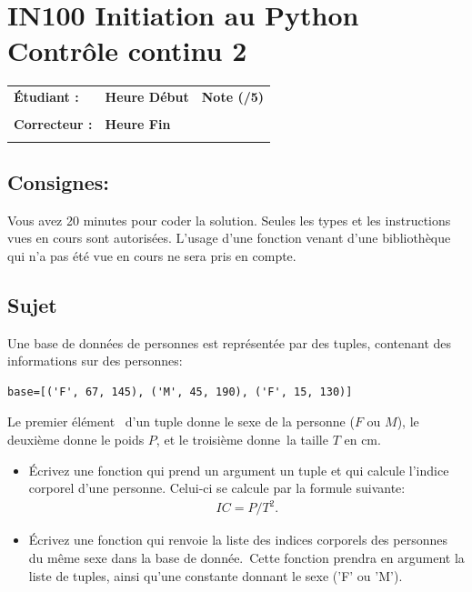 \documentclass[a4paper,11pt]{article}
\begin{document}
\newtheorem{theo}{Theorem}
\newtheorem{coro}{Corollary}[theo]
\newtheorem{lemme}{Lemma}
\renewcommand{\thecoro}{\thetheo.\arabic{coro}}



\parindent=0cm


\section*{\center IN100 Initiation au Python\\
Contrôle continu 2}

\vspace{1 cm}

\begin{table}[h!]
\centering
\renewcommand{\arraystretch}{1.4} %
\begin{tabular}{|p{10cm}|p{3cm}|p{2cm}|}
\hline
\textbf{Étudiant :} & \textbf{Heure Début }  & \textbf{Note (/5) }  \\
& & \\
\hline
\textbf{Correcteur :} & \textbf{Heure Fin } & \\
& & \\
\hline

\hline
\end{tabular}
\end{table}


\subsection*{Consignes:} Vous avez 20 minutes pour coder la solution. Seules les types et les instructions vues en cours sont autorisées. L'usage d'une fonction 
venant d'une bibliothèque qui n'a pas été vue en cours ne sera pris en compte. 


\subsection*{Sujet}


Une base de données de personnes est représentée par des tuples,  contenant des informations sur des personnes: 

\begin{verbatim}
base=[('F', 67, 145), ('M', 45, 190), ('F', 15, 130)]
\end{verbatim}

Le premier élément  d'un tuple donne le sexe de la personne ($F$ ou $M$), le deuxième donne le poids $P$, et le troisième donne la taille $T$ en cm. 
\begin{itemize}
\item[1.]  \'Ecrivez une fonction qui prend un argument un tuple et qui calcule l'indice corporel d'une personne. Celui-ci se calcule par la formule suivante: 
\begin{eqnarray*}
IC=P/T^2.
\end{eqnarray*}
\item[2.] \'Ecrivez une fonction qui renvoie la liste des indices corporels des personnes du même sexe dans la base de donnée. Cette fonction prendra en argument la liste de tuples, ainsi qu'une constante donnant le sexe ('F' ou 'M'). 
\end{itemize}
\end{document}

